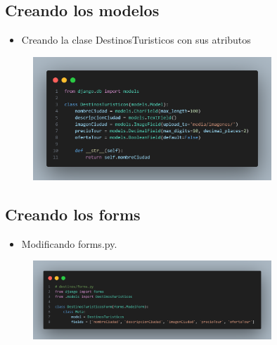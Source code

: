 \documentclass{article}
\begin{document}
    \subsection{Creando los modelos}
    \begin{itemize}
		\item Creando la clase DestinosTuristicos con sus atributos
	\end{itemize}
	\begin{figure}[H]
		\centering
		\includegraphics[width=0.8\textwidth,keepaspectratio]{img/model.png}
	\end{figure}

	\subsection{Creando los forms}
    \begin{itemize}
		\item Modificando forms.py.
	\end{itemize}
	\begin{figure}[H]
		\centering
		\includegraphics[width=0.8\textwidth,keepaspectratio]{img/forms.png}
	\end{figure}
	
\end{document}
